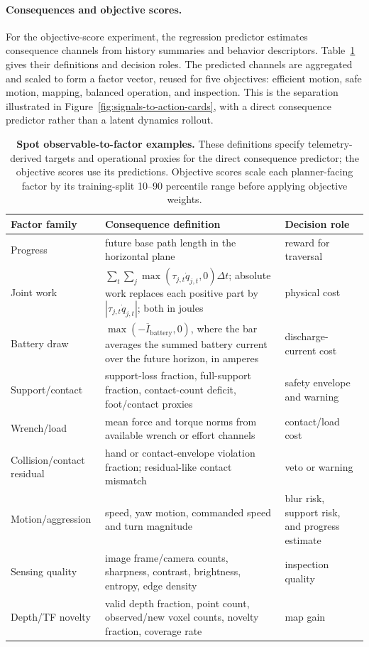 \paragraph{Consequences and objective scores.}
For the objective-score experiment, the regression predictor estimates
consequence channels from history summaries and behavior descriptors.
Table~\ref{tab:spot-factors-arxiv} gives their definitions and decision roles.
The predicted channels are aggregated and scaled to form a factor vector,
reused for five objectives: efficient motion, safe motion, mapping, balanced
operation, and inspection. This is the separation illustrated in
Figure~\ref{fig:signals-to-action-cards}, with a direct consequence predictor
rather than a latent dynamics rollout.

\begin{table}[H]
\centering
\scriptsize
\caption{\textbf{Spot observable-to-factor examples.}
These definitions specify telemetry-derived targets and operational proxies
for the direct consequence predictor; the objective scores use its predictions.
Objective scores scale each planner-facing factor by its training-split 10--90 percentile range before applying objective weights.}
\label{tab:spot-factors-arxiv}
\begin{tabularx}{\linewidth}{@{}lXl@{}}
\toprule
\textbf{Factor family} & \textbf{Consequence definition} & \textbf{Decision role} \\
\midrule
Progress & future base path length in the horizontal plane & reward for traversal \\
Joint work & $\sum_t\sum_j\max(\tau_{j,t}\dot q_{j,t},0)\Delta t$; absolute work replaces each positive part by $|\tau_{j,t}\dot q_{j,t}|$; both in joules & physical cost \\
Battery draw & $\max(-\overline{I}_{\mathrm{battery}},0)$, where the bar averages the summed battery current over the future horizon, in amperes & discharge-current cost \\
Support/contact & support-loss fraction, full-support fraction, contact-count deficit, foot/contact proxies & safety envelope and warning \\
Wrench/load & mean force and torque norms from available wrench or effort channels & contact/load cost \\
Collision/contact residual & hand or contact-envelope violation fraction; residual-like contact mismatch & veto or warning \\
Motion/aggression & speed, yaw motion, commanded speed and turn magnitude & blur risk, support risk, and progress estimate \\
Sensing quality & image frame/camera counts, sharpness, contrast, brightness, entropy, edge density & inspection quality \\
Depth/TF novelty & valid depth fraction, point count, observed/new voxel counts, novelty fraction, coverage rate & map gain \\
\bottomrule
\end{tabularx}
\end{table}


